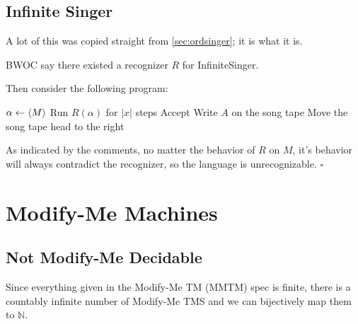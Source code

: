 \documentclass[12pt]{article}
\newcommand{\N}{\mathbb{N}}
\begin{document}
\pagebreak

\subsection{Infinite Singer}

A lot of this was copied straight from \ref{sec:ordsinger}; it is what it is.

BWOC say there existed a recognizer $R$ for InfiniteSinger.

Then consider the following program:
\begin{algorithmic}[1]
        \State $\alpha \gets \Braket{M}$
        \State Run $R(\alpha)$ for $|x|$ steps
            \State Accept
        \Else
            \For{$n \in \N$}
                \State Write $A$ on the song tape
                \State Move the song tape head to the right
            \EndFor    
        \EndIf
    \EndProcedure
\end{algorithmic}
As indicated by the comments, no matter the behavior of $R$ on $M$,
it's behavior will always contradict the recognizer,
so the language is unrecognizable. $\square$

\pagebreak

\section{Modify-Me Machines}

\subsection{Not Modify-Me Decidable}


Since everything given in the Modify-Me TM (MMTM) spec is finite, there is a countably
infinite number of Modify-Me TMS and we can bijectively map them to $\N$.
\end{document}
